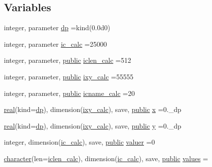 \subsection*{Variables}
\begin{DoxyCompactItemize}
\item 
integer, parameter \hyperlink{namespacem__calculator_aefb5a6c3001bb0f09ed82decb6def950}{dp} =kind(0.\+0d0)
\item 
integer, parameter \hyperlink{namespacem__calculator_a462e5bf8d038196149ba96c22a614284}{ic\+\_\+calc} =25000
\item 
integer, parameter, \hyperlink{M__stopwatch_83_8txt_a2f74811300c361e53b430611a7d1769f}{public} \hyperlink{namespacem__calculator_accf705491e8bd9b3d2f0d04fd13712e7}{iclen\+\_\+calc} =512
\item 
integer, parameter, \hyperlink{M__stopwatch_83_8txt_a2f74811300c361e53b430611a7d1769f}{public} \hyperlink{namespacem__calculator_addb6e867e526d278a9901ef8e7ff8bb6}{ixy\+\_\+calc} =55555
\item 
integer, parameter, \hyperlink{M__stopwatch_83_8txt_a2f74811300c361e53b430611a7d1769f}{public} \hyperlink{namespacem__calculator_a482f8880712dc8f52ef6833de3243875}{icname\+\_\+calc} =20
\item 
\hyperlink{read__watch_83_8txt_abdb62bde002f38ef75f810d3a905a823}{real}(kind=\hyperlink{namespacem__calculator_aefb5a6c3001bb0f09ed82decb6def950}{dp}), dimension(\hyperlink{namespacem__calculator_addb6e867e526d278a9901ef8e7ff8bb6}{ixy\+\_\+calc}), save, \hyperlink{M__stopwatch_83_8txt_a2f74811300c361e53b430611a7d1769f}{public} \hyperlink{namespacem__calculator_a92431c21aee174f56eab4bd7afbb8aba}{x} =0.\+\_\+dp
\item 
\hyperlink{read__watch_83_8txt_abdb62bde002f38ef75f810d3a905a823}{real}(kind=\hyperlink{namespacem__calculator_aefb5a6c3001bb0f09ed82decb6def950}{dp}), dimension(\hyperlink{namespacem__calculator_addb6e867e526d278a9901ef8e7ff8bb6}{ixy\+\_\+calc}), save, \hyperlink{M__stopwatch_83_8txt_a2f74811300c361e53b430611a7d1769f}{public} \hyperlink{namespacem__calculator_affdb371c2a552e5a31bfe542a2b837cd}{y} =0.\+\_\+dp
\item 
integer, dimension(\hyperlink{namespacem__calculator_a462e5bf8d038196149ba96c22a614284}{ic\+\_\+calc}), save, \hyperlink{M__stopwatch_83_8txt_a2f74811300c361e53b430611a7d1769f}{public} \hyperlink{namespacem__calculator_a7d1d50fdb797826d4722b3a6d2e38442}{valuer} =0
\item 
\hyperlink{option__stopwatch_83_8txt_abd4b21fbbd175834027b5224bfe97e66}{character}(len=\hyperlink{namespacem__calculator_accf705491e8bd9b3d2f0d04fd13712e7}{iclen\+\_\+calc}), dimension(\hyperlink{namespacem__calculator_a462e5bf8d038196149ba96c22a614284}{ic\+\_\+calc}), save, \hyperlink{M__stopwatch_83_8txt_a2f74811300c361e53b430611a7d1769f}{public} \hyperlink{namespacem__calculator_ad2574ef504a32d93ad0c76a9a8e1c626}{values} =\textquotesingle{} \textquotesingle{}

\end{DoxyCompactItemize}
